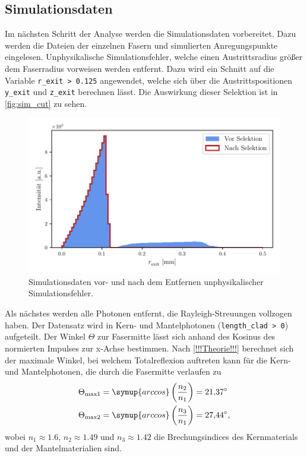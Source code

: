 \subsection{Simulationsdaten}
Im nächsten Schritt der Analyse werden die Simulationsdaten vorbereitet. Dazu werden die Dateien der einzelnen Fasern und simulierten Anregungspunkte eingelesen.
Unphysikalische Simulationsfehler, welche einen Austrittsradius größer dem Faserradius vorweisen werden entfernt. Dazu wird ein Schnitt auf die Variable \texttt{r\_exit > 0.125}
angewendet, welche sich über die Austrittspositionen \texttt{y\_exit} und \texttt{z\_exit} berechnen lässt. Die Auswirkung dieser Selektion ist in \autoref{fig:sim_cut} zu sehen.
\begin{figure}
  \centering
  \includegraphics[width = .8\textwidth]{content/pics/r_exit_cut.pdf}
  \caption{Simulationsdaten vor- und nach dem Entfernen unphysikalischer Simulationsfehler.}
  \label{fig:sim_cut}
\end{figure}
Als nächstes werden alle Photonen entfernt, die Rayleigh-Streuungen vollzogen haben. Der Datensatz wird in Kern- und Mantelphotonen (\texttt{length\_clad > 0}) aufgeteilt.
Der Winkel $\Theta$ zur Fasermitte lässt sich anhand des Kosinus des normierten Impulses zur x-Achse bestimmen.
Nach \autoref{!!!Theorie!!!} berechnet sich der maximale Winkel, bei welchem Totalreflexion auftreten kann für die Kern- und Mantelphotonen, die durch die Fasermitte verlaufen zu 
\begin{align*}
  \Theta_\text{max1} &= \symup{arccos}\left(\frac{n_2}{n_1}\right) = \qty{21.37}{\degree} \\
  \Theta_\text{max2} &= \symup{arccos}\left(\frac{n_3}{n_1}\right) = \qty{27.44}{\degree},
\end{align*}
wobei $n_1 \approx \num{1.6}$, $n_2 \approx \num{1.49}$ und $n_3 \approx \num{1.42}$ die Brechungsindices des Kernmaterials und der Mantelmaterialien sind.
